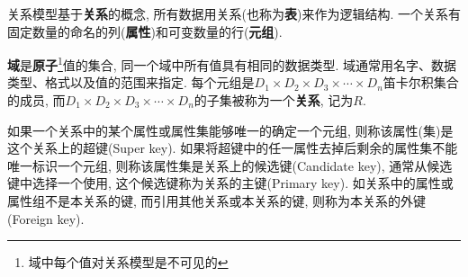         关系模型基于\textbf{关系}的概念, 所有数据用关系(也称为\textbf{表})来作为逻辑结构. 一个关系有固定数量的命名的列(\textbf{属性})和可变数量的行(\textbf{元组}).

        \textbf{域}是\textbf{原子}\footnote{域中每个值对关系模型是不可见的}值的集合, 同一个域中所有值具有相同的数据类型. 域通常用名字、数据类型、格式以及值的范围来指定. 每个元组是$D_1\times D_2\times D_3\times\cdots\times D_n$笛卡尔积集合的成员, 而$D_1\times D_2\times D_3\times\cdots\times D_n$的子集被称为一个\textbf{关系}, 记为$R$.

        如果一个关系中的某个属性或属性集能够唯一的确定一个元组, 则称该属性(集)是这个关系上的超键(Super key). 如果将超键中的任一属性去掉后剩余的属性集不能唯一标识一个元组, 则称该属性集是关系上的候选键(Candidate key), 通常从候选键中选择一个使用, 这个候选键称为关系的主键(Primary key). 如关系中的属性或属性组不是本关系的键, 而引用其他关系或本关系的键, 则称为本关系的外键(Foreign key).




